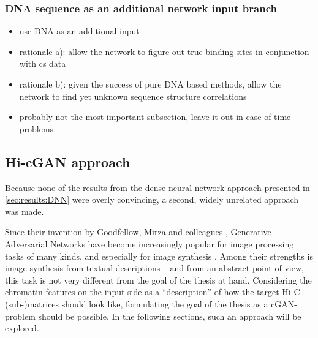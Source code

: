  

\subsubsection{DNA sequence as an additional network input branch}
\begin{itemize}
 \item use DNA as an additional input
 \item rationale a): allow the network to figure out true binding sites in conjunction with cs data
 \item rationale b): given the success of pure DNA based methods, allow the network to find yet unknown sequence structure correlations
 \item probably not the most important subsection, leave it out in case of time problems
\end{itemize}

\subsection{Hi-cGAN approach} \label{sec:improve:Hi-cGAN}
Because none of the results from the dense neural network approach presented in \cref{sec:results:DNN} were overly convincing,
a second, widely unrelated approach was made.

Since their invention by Goodfellow, Mirza and colleagues \cite{Goodfellow2014, mirza2014},
Generative Adversarial Networks have become increasingly popular for image processing tasks of many kinds,
and especially for image synthesis \cite{Wang2020}. 
Among their strengths is image synthesis from textual descriptions \cite{Reed2016,Zhang2019c,Zhu2019,Tao2020} --
and from an abstract point of view, this task is not very different from the goal of the thesis at hand.
Considering the chromatin features on the input side as a ``description'' of how the target Hi-C (sub-)matrices should look like,
formulating the goal of the thesis as a cGAN-problem should be possible.
In the following sections, such an approach will be explored.

